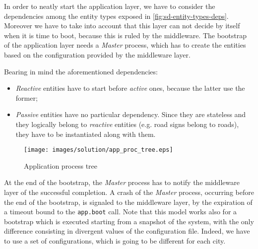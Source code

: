 In order to neatly start the application layer, we have to consider the
dependencies among the entity types exposed in \ref{fig:sd-entity-types-deps}.
Moreover we have to take into account that this layer can not decide by itself
when it is time to boot, because this is ruled by the middleware.
The bootstrap of the application layer needs a \textit{Master} process,
which has to create the entities based on the configuration provided by
the middleware layer.

Bearing in mind the aforementioned dependencies:
\begin{itemize}
  \item \textit{Reactive} entities have to start before \textit{active}
ones, because the latter use the former;
  \item \textit{Passive} entities have no particular dependency. Since
they are stateless and they logically belong to \textit{reactive} entities
(e.g. road signs belong to roads), they have to be instantiated along with them.
\end{itemize}

\begin{figure}[H]
  \centering
  \texttt{[image: images/solution/app\_proc\_tree.eps]}
  \caption{Application process tree}
  \label{fig:app-proc-tree}
\end{figure}

At the end of the bootstrap, the \textit{Master} process has to notify the
middleware layer of the successful completion. A crash of the
\textit{Master} process, occurring before the end of the bootstrap,
is signaled to the middleware layer, by the expiration of a timeout bound to
the \texttt{app.boot} call.
Note that this model works also for a bootstrap which is executed starting
from a snapshot of the system, with the only difference consisting in divergent
values of the configuration file. Indeed, we have to use a set of
configurations, which is going to be different for each city.